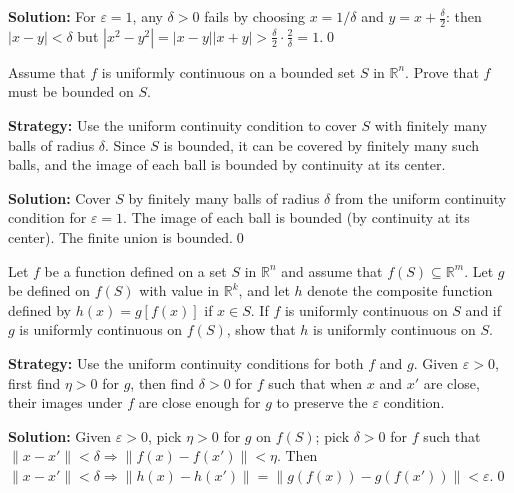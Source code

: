 \bigskip\noindent\textbf{Solution:}
For $\varepsilon=1$, any $\delta>0$ fails by choosing $x=1/\delta$ and $y=x+\tfrac{\delta}{2}$: then $|x-y|<\delta$ but $|x^2-y^2|=|x-y||x+y|>\tfrac{\delta}{2}\cdot\tfrac{2}{\delta}=1$.\qed



\begin{problembox}
\begin{problemstatement}
Assume that $f$ is uniformly continuous on a bounded set $S$ in $\mathbb{R}^n$. Prove that $f$ must be bounded on $S$.
\end{problemstatement}
\end{problembox}

\noindent\textbf{Strategy:} Use the uniform continuity condition to cover $S$ with finitely many balls of radius $\delta$. Since $S$ is bounded, it can be covered by finitely many such balls, and the image of each ball is bounded by continuity at its center.

\bigskip\noindent\textbf{Solution:}
Cover $S$ by finitely many balls of radius $\delta$ from the uniform continuity condition for $\varepsilon=1$. The image of each ball is bounded (by continuity at its center). The finite union is bounded.\qed



\begin{problembox}
\begin{problemstatement}
Let $f$ be a function defined on a set $S$ in $\mathbb{R}^n$ and assume that $f(S) \subseteq \mathbb{R}^m$. Let $g$ be defined on $f(S)$ with value in $\mathbb{R}^k$, and let $h$ denote the composite function defined by $h(x) = g[f(x)]$ if $x \in S$. If $f$ is uniformly continuous on $S$ and if $g$ is uniformly continuous on $f(S)$, show that $h$ is uniformly continuous on $S$.
\end{problemstatement}
\end{problembox}

\noindent\textbf{Strategy:} Use the uniform continuity conditions for both $f$ and $g$. Given $\varepsilon > 0$, first find $\eta > 0$ for $g$, then find $\delta > 0$ for $f$ such that when $x$ and $x'$ are close, their images under $f$ are close enough for $g$ to preserve the $\varepsilon$ condition.

\bigskip\noindent\textbf{Solution:}
Given $\varepsilon>0$, pick $\eta>0$ for $g$ on $f(S)$; pick $\delta>0$ for $f$ such that $\|x-x'\|<\delta\Rightarrow \|f(x)-f(x')\|<\eta$. Then $\|x-x'\|<\delta\Rightarrow \|h(x)-h(x')\|=\|g(f(x))-g(f(x'))\|<\varepsilon$.\qed



